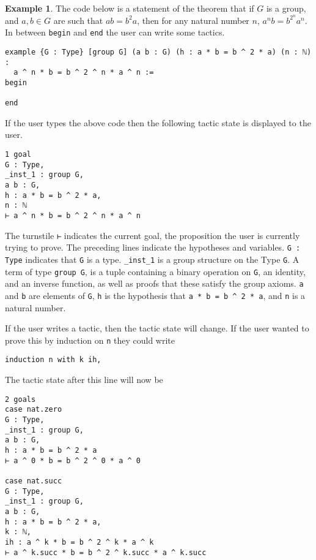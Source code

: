 \documentclass[12pt]{article} %
\theoremstyle{definition}
\theoremstyle{definition}
\theoremstyle{definition}
\theoremstyle{definition}
\theoremstyle{definition}
\theoremstyle{definition}
\newtheorem{exmpl}{Example}[theorem]
\begin{document}
\begin{exmpl}

The code below is a statement of the theorem that if $G$ is a group, and
$a, b ∈ G$ are such that $ab = b^2a$, then for any natural number $n$,
$a^nb = b^{2^n}a^n$. In between \lstinline{begin} and \lstinline{end} the user
can write some tactics.

\begin{lstlisting}
example {G : Type} [group G] (a b : G) (h : a * b = b ^ 2 * a) (n : ℕ) :
  a ^ n * b = b ^ 2 ^ n * a ^ n :=
begin

end
\end{lstlisting}

If the user types the above code then the following tactic state is displayed to the user.

\begin{lstlisting}
1 goal
G : Type,
_inst_1 : group G,
a b : G,
h : a * b = b ^ 2 * a,
n : ℕ
⊢ a ^ n * b = b ^ 2 ^ n * a ^ n
\end{lstlisting}

The turnstile \lstinline{⊢} indicates the current goal, the proposition the user
is currently trying to prove. The preceding lines indicate the hypotheses and variables.
\lstinline{G : Type} indicates that \lstinline{G} is a type.
\lstinline{_inst_1} is a group structure on the Type \lstinline{G}.
A term of type \lstinline{group G}, is a tuple containing a binary operation on
\lstinline{G}, an identity, and an inverse function, as well as proofs that these
satisfy the group axioms. \lstinline{a} and \lstinline{b} are elements of
\lstinline{G}, \lstinline{h} is the hypothesis that \lstinline{a * b = b ^ 2 * a},
and \lstinline{n} is a natural number.

If the user writes a tactic, then the tactic state will change. If the user
wanted to prove this by induction on \lstinline{n} they could write

\begin{lstlisting}
induction n with k ih,
\end{lstlisting}

The tactic state after this line will now be

\begin{lstlisting}
2 goals
case nat.zero
G : Type,
_inst_1 : group G,
a b : G,
h : a * b = b ^ 2 * a
⊢ a ^ 0 * b = b ^ 2 ^ 0 * a ^ 0

case nat.succ
G : Type,
_inst_1 : group G,
a b : G,
h : a * b = b ^ 2 * a,
k : ℕ,
ih : a ^ k * b = b ^ 2 ^ k * a ^ k
⊢ a ^ k.succ * b = b ^ 2 ^ k.succ * a ^ k.succ
\end{lstlisting}


\end{exmpl}
\end{document}
